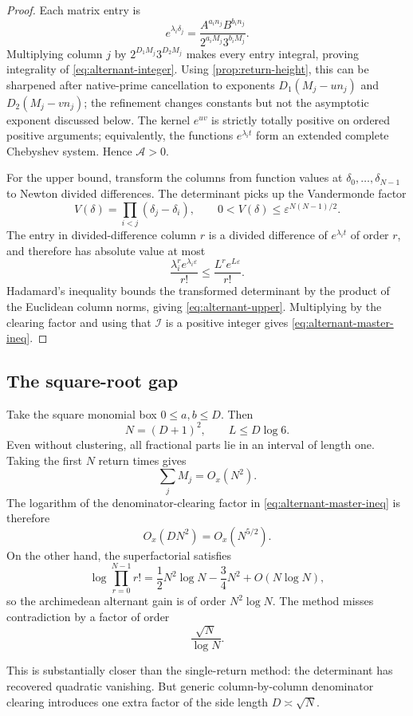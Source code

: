 \documentclass[11pt]{article}
\theoremstyle{definition}
\theoremstyle{remark}
\begin{document}
\begin{proof}
Each matrix entry is
\[
 e^{\lambda_i\delta_j}
 =\frac{A^{a_in_j}B^{b_in_j}}
 {2^{a_iM_j}3^{b_iM_j}}.
\]
Multiplying column $j$ by $2^{D_1M_j}3^{D_2M_j}$ makes every entry integral, proving integrality of \eqref{eq:alternant-integer}. Using \cref{prop:return-height}, this can be sharpened after native-prime cancellation to exponents $D_1(M_j-u n_j)$ and $D_2(M_j-v n_j)$; the refinement changes constants but not the asymptotic exponent discussed below. The kernel $e^{uv}$ is strictly totally positive on ordered positive arguments; equivalently, the functions $e^{\lambda_i t}$ form an extended complete Chebyshev system. Hence $\mathcal A>0$.

For the upper bound, transform the columns from function values at $\delta_0,\ldots,\delta_{N-1}$ to Newton divided differences. The determinant picks up the Vandermonde factor
\[
 V(\delta)=\prod_{i<j}(\delta_j-\delta_i),
 \qquad 0<V(\delta)\le\varepsilon^{N(N-1)/2}.
\]
The entry in divided-difference column $r$ is a divided difference of $e^{\lambda_i t}$ of order $r$, and therefore has absolute value at most
\[
 \frac{\lambda_i^r e^{\lambda_i\varepsilon}}{r!}
 \le \frac{L^r e^{L\varepsilon}}{r!}.
\]
Hadamard's inequality bounds the transformed determinant by the product of the Euclidean column norms, giving \eqref{eq:alternant-upper}. Multiplying by the clearing factor and using that $\mathcal I$ is a positive integer gives \eqref{eq:alternant-master-ineq}.
\end{proof}

\subsection{The square-root gap}

Take the square monomial box $0\le a,b\le D$. Then
\[
 N=(D+1)^2,\qquad L\le D\log6.
\]
Even without clustering, all fractional parts lie in an interval of length one. Taking the first $N$ return times gives
\[
 \sum_jM_j=O_x(N^2).
\]
The logarithm of the denominator-clearing factor in \eqref{eq:alternant-master-ineq} is therefore
\[
 O_x(DN^2)=O_x(N^{5/2}).
\]
On the other hand, the superfactorial satisfies
\[
 \log\prod_{r=0}^{N-1}r!
 =\frac12N^2\log N-\frac34N^2+O(N\log N),
\]
so the archimedean alternant gain is of order $N^2\log N$. The method misses contradiction by a factor of order
\[
 \frac{\sqrt N}{\log N}.
\]

This is substantially closer than the single-return method: the determinant has recovered quadratic vanishing. But generic column-by-column denominator clearing introduces one extra factor of the side length $D\asymp\sqrt N$.
\end{document}
